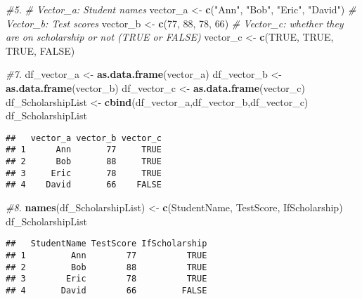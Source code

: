 \documentclass[
]{article}
\newenvironment{Shaded}{\begin{snugshade}}{\end{snugshade}}
\newcommand{\CommentTok}[1]{\textcolor[rgb]{0.56,0.35,0.01}{\textit{#1}}}
\newcommand{\ConstantTok}[1]{\textcolor[rgb]{0.56,0.35,0.01}{#1}}
\newcommand{\DecValTok}[1]{\textcolor[rgb]{0.00,0.00,0.81}{#1}}
\newcommand{\FunctionTok}[1]{\textcolor[rgb]{0.13,0.29,0.53}{\textbf{#1}}}
\newcommand{\NormalTok}[1]{#1}
\newcommand{\OtherTok}[1]{\textcolor[rgb]{0.56,0.35,0.01}{#1}}
\newcommand{\StringTok}[1]{\textcolor[rgb]{0.31,0.60,0.02}{#1}}
\begin{document}
\begin{Shaded}
\begin{Highlighting}[]
\CommentTok{\#5.}
\CommentTok{\# Vector\_a: Student names}
\NormalTok{vector\_a }\OtherTok{\textless{}{-}} \FunctionTok{c}\NormalTok{(}\StringTok{"Ann"}\NormalTok{, }\StringTok{"Bob"}\NormalTok{, }\StringTok{"Eric"}\NormalTok{, }\StringTok{"David"}\NormalTok{) }
\CommentTok{\# Vector\_b: Test scores}
\NormalTok{vector\_b }\OtherTok{\textless{}{-}} \FunctionTok{c}\NormalTok{(}\DecValTok{77}\NormalTok{, }\DecValTok{88}\NormalTok{, }\DecValTok{78}\NormalTok{, }\DecValTok{66}\NormalTok{)}
\CommentTok{\# Vector\_c: whether they are on scholarship or not (TRUE or FALSE)}
\NormalTok{vector\_c }\OtherTok{\textless{}{-}} \FunctionTok{c}\NormalTok{(}\ConstantTok{TRUE}\NormalTok{, }\ConstantTok{TRUE}\NormalTok{, }\ConstantTok{TRUE}\NormalTok{, }\ConstantTok{FALSE}\NormalTok{)}

\CommentTok{\#7.}
\NormalTok{df\_vector\_a }\OtherTok{\textless{}{-}} \FunctionTok{as.data.frame}\NormalTok{(vector\_a)}
\NormalTok{df\_vector\_b }\OtherTok{\textless{}{-}} \FunctionTok{as.data.frame}\NormalTok{(vector\_b)}
\NormalTok{df\_vector\_c }\OtherTok{\textless{}{-}} \FunctionTok{as.data.frame}\NormalTok{(vector\_c)}
\NormalTok{df\_ScholarshipList }\OtherTok{\textless{}{-}} \FunctionTok{cbind}\NormalTok{(df\_vector\_a,df\_vector\_b,df\_vector\_c)}
\NormalTok{df\_ScholarshipList}
\end{Highlighting}
\end{Shaded}

\begin{verbatim}
##   vector_a vector_b vector_c
## 1      Ann       77     TRUE
## 2      Bob       88     TRUE
## 3     Eric       78     TRUE
## 4    David       66    FALSE
\end{verbatim}

\begin{Shaded}
\begin{Highlighting}[]
\CommentTok{\#8.}
\FunctionTok{names}\NormalTok{(df\_ScholarshipList) }\OtherTok{\textless{}{-}} \FunctionTok{c}\NormalTok{(}\StringTok{\textquotesingle{}StudentName\textquotesingle{}}\NormalTok{, }\StringTok{\textquotesingle{}TestScore\textquotesingle{}}\NormalTok{, }\StringTok{\textquotesingle{}IfScholarship\textquotesingle{}}\NormalTok{)}
\NormalTok{df\_ScholarshipList}
\end{Highlighting}
\end{Shaded}

\begin{verbatim}
##   StudentName TestScore IfScholarship
## 1         Ann        77          TRUE
## 2         Bob        88          TRUE
## 3        Eric        78          TRUE
## 4       David        66         FALSE
\end{verbatim}
\end{document}
